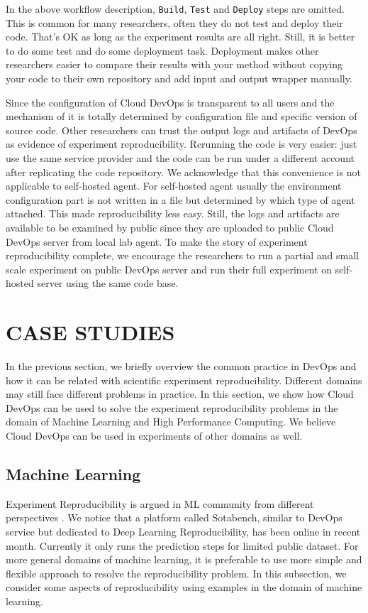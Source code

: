 \documentclass{IEEEcsmag}
\begin{document}
In the above workflow description, \texttt{Build}, \texttt{Test} and \texttt{Deploy} steps are omitted. This is common for many researchers, often they do not test and deploy their code. That's OK as long as the experiment results are all right. Still, it is better to do some test and do some deployment task. Deployment makes other researchers easier to compare their results with your method without copying your code to their own repository and add input and output wrapper manually.

Since the configuration of Cloud DevOps is transparent to all users and the mechanism of it is totally determined by configuration file and specific version of source code. Other researchers can trust the output logs and artifacts of DevOps as evidence of experiment reproducibility. Rerunning the code is very easier: just use the same service provider and the code can be run under a different account after replicating the code repository. We acknowledge that this convenience is not applicable to self-hosted agent. For self-hosted agent usually the environment configuration part is not written in a file but determined by which type of agent attached. This made reproducibility less easy. Still, the logs and artifacts are available to be examined by public since they are uploaded to public Cloud DevOps server from local lab agent. To make the story of experiment reproducibility complete,
we encourage the researchers to run a partial and small scale experiment on public DevOps server and run their full experiment on self-hosted server using the same code base. 

\section{CASE STUDIES}
In the previous section, we briefly overview the common practice in DevOps and how it can be related with scientific experiment reproducibility. Different domains may still face different problems in practice. In this section, we show how Cloud DevOps can be used to solve the experiment reproducibility problems in the domain of Machine Learning and High Performance Computing. We believe Cloud DevOps can be used in experiments of other domains as well. 

\subsection{Machine Learning}
Experiment Reproducibility is argued in ML community from different perspectives \cite{kegl2018ramp}. We notice that a platform called Sotabench, similar to DevOps service but dedicated to Deep Learning Reproducibility, has been online in recent month. Currently it only runs the prediction steps for limited public dataset. For more general domains of machine learning, it is preferable to use more simple and flexible approach to resolve the reproducibility problem. In this subsection, we consider some aspects of reproducibility using examples in the domain of machine learning. 
\end{document}
